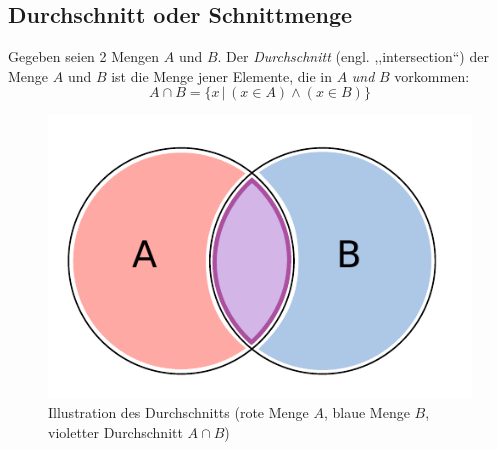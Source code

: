 \subsection{Durchschnitt oder Schnittmenge}
%
Gegeben seien 2 Mengen $A$ und $B$. Der \emph{Durchschnitt} (engl. ,,intersection``)
der Menge $A$ und $B$ ist die Menge jener Elemente, die in $A$ \emph{und}
$B$ vorkommen:
\[
    A \cap B = \{x \,|\, (x \in A) \land (x \in B)\}
\]
%
\begin{figure}[p]
 \begin{center}
  \includegraphics{img/intersection.pdf}
  \caption{Illustration des Durchschnitts (rote Menge $A$, blaue Menge $B$,
        violetter Durchschnitt $A \cap B$)}
  \label{fig:union}
 \end{center}
\end{figure}

